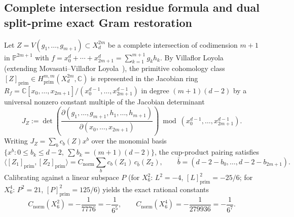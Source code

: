 \documentclass[11pt,a4paper]{amsart}
\theoremstyle{definition}
\newcommand{\CC}{\mathbb{C}}
\newcommand{\PP}{\mathbb{P}}
\newcommand{\prim}{\mathrm{prim}}
\begin{document}
\subsection{Complete intersection residue formula and dual split-prime exact Gram restoration}
Let $Z = V(g_1, \dots, g_{m+1}) \subset X_d^{2m}$ be a complete intersection of codimension $m+1$ in $\PP^{2m+1}$ with $f = x_0^d + \cdots + x_{2m+1}^d = \sum_{k=1}^{m+1} g_k h_k$. By Villaflor Loyola~\cite{VL22} (extending Movasati--Villaflor Loyola~\cite{MVL18}), the primitive cohomology class $[Z]_\prim \in H^{m,m}_\prim(X_d^{2m}, \CC)$ is represented in the Jacobian ring $R_f = \CC[x_0,\dots,x_{2m+1}]/(x_0^{d-1}, \dots, x_{2m+1}^{d-1})$ in degree $(m+1)(d-2)$ by a universal nonzero constant multiple of the Jacobian determinant
\[
  J_Z := \det\!\left(\frac{\partial(g_1,\dots,g_{m+1},h_1,\dots,h_{m+1})}{\partial(x_0,\dots,x_{2m+1})}\right) \bmod (x_0^{d-1},\dots,x_{2m+1}^{d-1}).
\]
Writing $J_Z = \sum_b c_b(Z) x^b$ over the monomial basis $\{x^b : 0 \le b_k \le d-2,\ \sum b_k = (m+1)(d-2)\}$, the cup-product pairing satisfies
\[
  \langle [Z_1]_\prim, [Z_2]_\prim \rangle = C_{\mathrm{norm}} \sum_b c_b(Z_1)\, c_{\bar{b}}(Z_2), \qquad \bar{b} = (d-2-b_0, \dots, d-2-b_{2m+1}).
\]
Calibrating against a linear subspace $P$ (for $X_6^2$: $L^2 = -4$, $[L]_\prim^2 = -25/6$; for $X_6^4$: $P^2 = 21$, $[P]_\prim^2 = 125/6$) yields the exact rational constants
\[
  C_{\mathrm{norm}}(X_6^2) = -\frac{1}{7776} = -\frac{1}{6^5}, \qquad C_{\mathrm{norm}}(X_6^4) = -\frac{1}{279936} = -\frac{1}{6^7}.
\]
\end{document}
